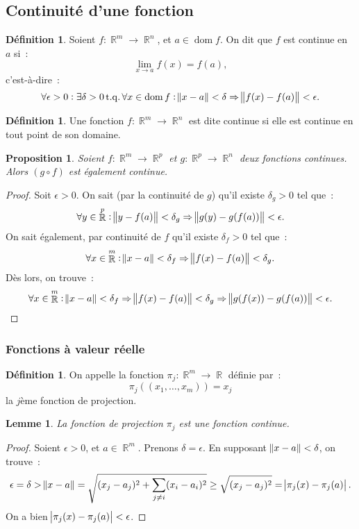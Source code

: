 \documentclass{article}
\DeclareMathOperator{\dom}{dom}
\DeclareMathOperator{\R}{\mathbb R}
\DeclareMathOperator{\tq}{ t.q. }
\newtheorem{prp}[thm]{Proposition}
\newtheorem{lem}[thm]{Lemme}
\theoremstyle{definition}
\newtheorem{déf}[thm]{Définition}
\theoremstyle{remark}
\begin{document}
	\subsection{Continuité d'une fonction}
		\begin{déf} Soient $f : \R^m \to \R^n$, et $a \in \dom f$. On dit que $f$ est continue en $a$ si~:
		\[\lim_{x \to a}f(x) = f(a),\]
		c'est-à-dire~:
		\[\forall \epsilon > 0 : \exists \delta >0 \tq \forall x \in \dom f : \norm {x-a} < \delta \Rightarrow \norm {f(x)-f(a)} < \epsilon.\]
		\end{déf}

		\begin{déf} Une fonction $f : \R^m \to \R^n$ est dite continue si elle est continue en tout point de son domaine. \end{déf}

		\begin{prp} Soient $f : \R^m \to \R^p$ et $g : \R^p \to \R^n$ deux fonctions continues. Alors $(g \circ f)$ est également continue. \end{prp}

		\begin{proof} Soit $\epsilon > 0$. On sait (par la continuité de $g$) qu'il existe $\delta_g > 0$ tel que~:
		\[\forall y \in \R^p : \norm{y - f(a)} < \delta_g \Rightarrow \norm{g(y) - g(f(a))} < \epsilon.\]
		On sait également, par continuité de $f$ qu'il existe $\delta_f > 0$ tel que~:
		\[\forall x \in \R^m : \norm{x - a} < \delta_f \Rightarrow \norm{f(x)-f(a)} < \delta_g.\]
		Dès lors, on trouve~:
		\[\forall x \in \R^m : \norm{x-a} < \delta_f \Rightarrow \norm{f(x)-f(a)} < \delta_g \Rightarrow \norm{g(f(x)) - g(f(a))} < \epsilon.\]
		\end{proof}

		\subsubsection{Fonctions à valeur réelle}
		\begin{déf} On appelle la fonction $\pi_j : \R^m \to \R$ définie par~:
		\[\pi_j((x_1, \dotsc, x_m)) = x_j\]
		la $j$ème fonction de projection.
		\end{déf}

		\begin{lem} La fonction de projection $\pi_j$ est une fonction continue. \end{lem}

		\begin{proof} Soient $\epsilon > 0$, et $a \in \R^m$. Prenons $\delta = \epsilon$. En supposant $\norm{x-a} < \delta$, on trouve~:
		\[\epsilon = \delta > \norm{x-a} = \sqrt {(x_j-a_j)^2 + \sum_{j \neq i}(x_i-a_i)^2} \geq \sqrt {(x_j-a_j)^2} = \abs {\pi_j(x)-\pi_j(a)}.\]
		On a bien $\abs {\pi_j(x)-\pi_j(a)} < \epsilon$.
		\end{proof}
\end{document}
